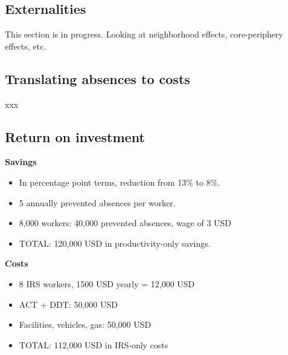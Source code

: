 \documentclass[]{article}
\providecommand{\tightlist}{%
  \setlength{\itemsep}{0pt}\setlength{\parskip}{0pt}}
\begin{document}
\subsection{Externalities}\label{externalities}

This section is in progress. Looking at neighborhood effects,
core-periphery effects, etc.

\subsection{Translating absences to
costs}\label{translating-absences-to-costs}

xxx

\subsection{Return on investment}\label{return-on-investment}


\textbf{Savings}

\begin{itemize}
\tightlist
\item
  In percentage point terms, reduction from 13\% to 8\%.\\
\item
  5 annually prevented absences per worker.\\
\item
  8,000 workers: 40,000 prevented absences, wage of 3 USD
\item
  TOTAL: 120,000 USD in productivity-only savings.
\end{itemize}

\textbf{Costs}

\begin{itemize}
\tightlist
\item
  8 IRS workers, 1500 USD yearly = 12,000 USD\\
\item
  ACT + DDT: 50,000 USD
\item
  Facilities, vehicles, gas: 50,000 USD\\
\item
  TOTAL: 112,000 USD in IRS-only costs
\end{itemize}
\end{document}
